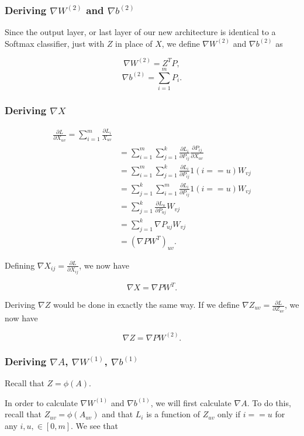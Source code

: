 \subsubsection{Deriving $\nabla W^{(2)}$ and $\nabla b^{(2)}$}
Since the output layer, or last layer of our new architecture is identical to a
Softmax classifier, just with $Z$ in place of $X$, we define $\nabla
W^{(2)}$ and $\nabla b^{(2)}$ as

$$ \nabla W^{(2)}  = Z^T P, $$
$$ \nabla b^{(2)}  = \sum_{i=1}^m P_i. $$

\subsubsection{Deriving $\nabla X$}
\begin{align*}
  \frac{\partial L}{\partial X_{uv}}
  =\sum_{i=1}^m \frac{\partial L_i}{X_{uv}}\\
  &= \sum_{i=1}^m \sum_{j=1}^k \frac{\partial L_i}{\partial P_{ij}}
      \frac{\partial P_{ij}}{\partial X_{uv}}\\
  &= \sum_{i=1}^m \sum_{j=1}^k \frac{\partial L_i}{\partial P_{ij}}
      1(i == u) W_{vj}\\
  &= \sum_{j=1}^k \sum_{i=1}^m \frac{\partial L_i}{\partial P_{ij}}
      1(i == u) W_{vj}\\
  &= \sum_{j=1}^k \frac{\partial L_u}{\partial P_{uj}} W_{vj}\\
  &= \sum_{j=1}^k \nabla P_{uj} W_{vj}\\
  &= \left( \nabla P W^T \right) _{uv}.
\end{align*}

Defining $\nabla X_{ij} = \frac{\partial L}{\partial X_{ij}}$, we now have

$$ \nabla X = \nabla P W^T. $$

Deriving $\nabla Z$ would be done in exactly the same way. If we define
$\nabla Z_{uv} = \frac{\partial L}{\partial Z_{uv}}$, we now have

$$ \nabla Z = \nabla P W^{(2)}. $$

\subsubsection{Deriving $\nabla A$, $\nabla W^{(1)}$, $\nabla b^{(1)}$}
Recall that $Z = \phi(A).$

In order to calculate $\nabla W^{(1)}$ and $\nabla b^{(1)}$, we will first
calculate $\nabla A$. To do this, recall that $Z_{uv} = \phi(A_{uv})$
and that $L_i$ is a function of $Z_{uv}$ only if $i == u$ for any $i, u, \in
[0, m]$. We see that

